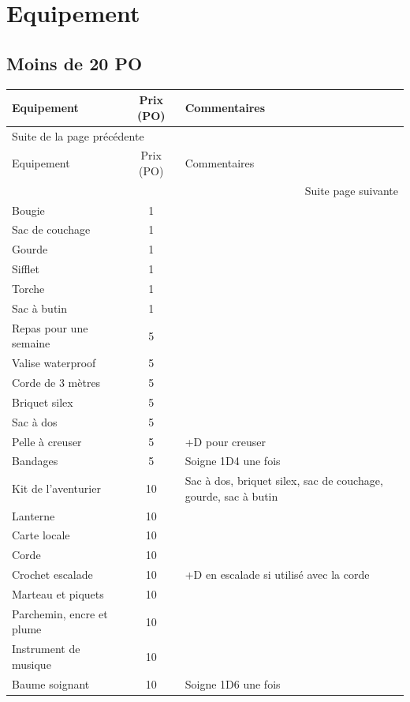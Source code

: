 \documentclass[a4paper, 11pt, twoside]{article}
\begin{document}
\newpage

\section{Equipement}
\label{sec:org0749790}

\subsection{Moins de 20 PO}
\label{sec:org7d075a3}

\begin{longtable}{l|c|p{10cm}}
Equipement & Prix (PO) & Commentaires\\
\hline
\endfirsthead
\multicolumn{3}{l}{Suite de la page précédente} \\
\hline

Equipement & Prix (PO) & Commentaires \\

\hline
\endhead
\hline\multicolumn{3}{r}{Suite page suivante} \\
\endfoot
\endlastfoot
\hline
Bougie & 1 & \\
Sac de couchage & 1 & \\
Gourde & 1 & \\
Sifflet & 1 & \\
Torche & 1 & \\
Sac à butin & 1 & \\
Repas pour une semaine & 5 & \\
Valise waterproof & 5 & \\
Corde de 3 mètres & 5 & \\
Briquet silex & 5 & \\
Sac à dos & 5 & \\
Pelle à creuser & 5 & +D pour creuser\\
Bandages & 5 & Soigne 1D4 une fois\\
Kit de l'aventurier & 10 & Sac à dos, briquet silex, sac de couchage, gourde, sac à butin\\
Lanterne & 10 & \\
Carte locale & 10 & \\
Corde & 10 & \\
Crochet escalade & 10 & +D en escalade si utilisé avec la corde\\
Marteau et piquets & 10 & \\
Parchemin, encre et plume & 10 & \\
Instrument de musique & 10 & \\
Baume soignant & 10 & Soigne 1D6 une fois\\
\end{longtable}
\end{document}
